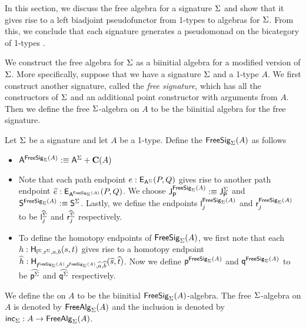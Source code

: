 In this section, we discuss the free algebra for a signature $\sign$ and show that it gives rise to a left biadjoint pseudofunctor from 1-types to algebras for $\sign$.
From this, we conclude that each signature generates a pseudomonad on the bicategory of 1-types \cite{LACK2000179}.

We construct the free algebra for $\sign$ as a biinitial algebra for a modified version of $\sign$.
More specifically, suppose that we have a signature $\sign$ and a 1-type $A$.
We first construct another signature, called the \emph{free signature}, which has all the constructors of $\sign$ and an additional point constructor with arguments from $A$.
Then we define the free $\sign$-algebra on $A$ to be the biinitial algebra for the free signature.

\begin{definition}\label{def:free_alg}
Let $\sign$ be a signature and let $A$ be a 1-type.
Define the  $\freesign{\sign}{A}$ as follows
\begin{itemize}
	\item $\pointconstr[\freesign{\sign}{A}] \eqdef \sumP{\pointconstr[\sign]}{\constantP{A}}$
	\item Note that each path endpoint $e : \pathendpoint{\pointconstr[\sign]}{P}{Q}$ gives rise to another path endpoint $\freepath{e} : \pathendpoint{\pointconstr[\freesign{\sign}{A}]}{P}{Q}$.
	We choose $\pathlabel[\freesign{\sign}{A}] \eqdef\pathlabel[\sign]$ and $\patharg[\freesign{\sign}{A}] \eqdef \patharg[\sign]$.
	Lastly, we define the endpoints $\pathleft[\freesign{\sign}{A}]_j$ and $\pathright[\freesign{\sign}{A}]_j$ to be $\freepath{\pathleft[\sign]_j}$ and $\freepath{\pathright[\sign]_j}$ respectively.
	\item To define the homotopy endpoints of $\freesign{\sign}{A}$, we first note that each $h : \homotendpoint{\pathleft[\sign]}{\pathright[\sign]}{a}{b}{s}{t}$ gives rise to a homotopy endpoint $\freehomot{h} : \homotendpoint{\pathleft[\freesign{\sign}{A}]}{\pathright[\freesign{\sign}{A}]}{\freepath{a}}{\freepath{b}}{\freepath{s}}{\freepath{t}}$.
	Now we define $\homotleft[\freesign{\sign}{A}]$ and $\homotright[\freesign{\sign}{A}]$ to be $\freehomot{\homotleft[\sign]}$ and $\freehomot{\homotright[\sign]}$ respectively.
\end{itemize}
We define the  on $A$ to be the biinitial $\freesign{\sign}{A}$-algebra.
The free $\sign$-algebra on $A$ is denoted by $\freealg{\sign}{A}$ and the inclusion is denoted by $\freealginc{\sign} : A \rightarrow \freealg{\sign}{A}$.
\end{definition}

